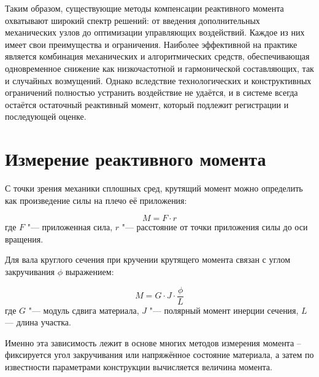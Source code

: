 Таким образом, существующие методы компенсации реактивного момента охватывают широкий спектр решений: от введения дополнительных механических узлов до оптимизации управляющих воздействий. Каждое из них имеет свои преимущества и ограничения. Наиболее эффективной на практике является комбинация механических и алгоритмических средств, обеспечивающая одновременное снижение как низкочастотной и гармонической составляющих, так и случайных возмущений. Однако вследствие технологических и конструктивных ограничений полностью устранить воздействие не удаётся, и в системе всегда остаётся остаточный реактивный момент, который подлежит регистрации и последующей оценке.

\section{Измерение реактивного момента}


С точки зрения механики сплошных сред, крутящий момент можно определить как произведение силы на плечо её приложения:

\begin{equation}
	\label{eq:eq_Torque}
	M=F \cdot r
\end{equation}
где \(F\) "--- приложенная сила, \(r\) "--- расстояние от точки приложения силы до оси вращения.

Для вала круглого сечения при кручении крутящего момента связан с углом закручивания $\phi$ выражением:

\begin{equation}
	\label{eq:eq_torque}
	M=G\cdot J \cdot \frac{\phi}{L}
\end{equation}
где \(G\) "--- модуль сдвига материала, \(J\) "--- полярный момент инерции сечения, \(L\) --- длина участка.

Именно эта зависимость лежит в основе многих методов измерения момента -- фиксируется угол закручивания или напряжённое состояние материала, а затем по известности параметрами конструкции вычисляется величина момента.

